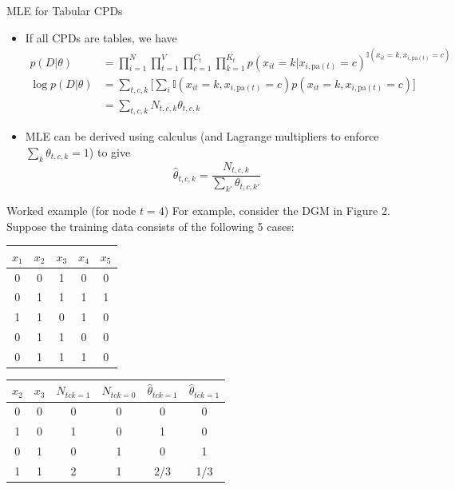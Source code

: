 \documentclass[10pt,mathserif]{beamer}
\begin{document}
\begin{frame}{MLE for Tabular CPDs}
\begin{itemize}
    \item If all CPDs are tables, we have
    \begin{equation}
        \begin{split}
            p(D|\theta) & = \prod_{i=1}^N \prod_{t=1}^V \prod_{c=1}^{C_t} \prod_{k=1}^{K_t} p(x_{it} = k | x_{i,\text{pa}(t)} = c)^{\mathbb{I} (x_{it} = k, x_{i,\text{pa}(t)} = c)}\\
            \log p(D|\theta) & = \sum_{t,c,k} \bigg[ \sum_i \mathbb{I} (x_{it} = k, x_{i,\text{pa}(t)} = c) p (x_{it} = k, x_{i,\text{pa}(t)} = c)\bigg]\\
            & = \sum_{t,c,k} N_{t,c,k} \theta_{t,c,k} 
        \end{split}
    \end{equation}
    \item MLE can be derived using calculus (and Lagrange multipliers to enforce  $\sum_k \theta_{t,c,k} = 1$) to give
    \begin{equation}
        \hat{\theta}_{t,c,k} = \frac{N_{t,c,k}}{\sum_{k'} \theta_{t,c,k'}}
    \end{equation}
\end{itemize}
\end{frame}

\begin{frame}{Worked example (for node $t = 4$)}
For example, consider the DGM in Figure 2. Suppose the training data consists of the following 5 cases:

\begin{table}[h!]
    \centering
    \begin{tabular}{c c c c c }
        $x_1$ & $x_2$ & $x_3$ & $x_4$ & $x_5$ \\
    \hline
        0 & 0 & 1 & 0 & 0\\
        0 & 1 & 1 & 1 & 1\\
        1 & 1 & 0 & 1 & 0\\
        0 & 1 & 1 & 0 & 0\\
        0 & 1 & 1 & 1 & 0
    \end{tabular}
    \label{tab:my_label}
\end{table}

\begin{table}[h!]
    \centering
    \begin{tabular}{ c c | c c | c c}
        $x_2$ & $x_3$ & $N_{tck=1}$ & $N_{tck=0}$ & $\hat{\theta}_{tck=1}$ & $\hat{\theta}_{tck=1}$\\
    \hline
        0 & 0 & 0 & 0 & 0 & 0\\
        1 & 0 & 1 & 0 & 1 & 0\\
        0 & 1 & 0 & 1 & 0 & 1\\
        1 & 1 & 2 & 1 & 2/3  & 1/3
    \end{tabular}
    \label{tab:my_label}
\end{table} 
\end{frame}
\end{document}
